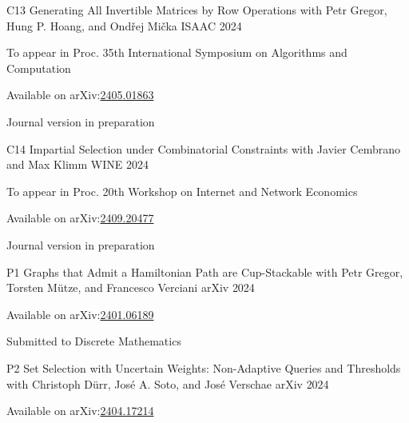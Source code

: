 \begin{cvpublication}
	{C13}
	{Generating All Invertible Matrices by Row Operations}
	{with Petr Gregor, Hung P. Hoang, and Ondřej Mička}
	{ISAAC}
	{2024}
    {
	\begin{cvitems}
	\item To appear in Proc. 35th International Symposium on Algorithms and Computation
	\item[] Available on arXiv:\href{https://arxiv.org/abs/2405.01863}{2405.01863}
	\item Journal version in preparation
	\end{cvitems}
	}
\end{cvpublication}
\begin{cvpublication}
	{C14}
	{Impartial Selection under Combinatorial Constraints}
	{with Javier Cembrano and Max Klimm}
	{WINE}
	{2024}
    {
	\begin{cvitems}
	\item To appear in Proc. 20th Workshop on Internet and Network Economics
	\item[] Available on arXiv:\href{https://arxiv.org/abs/2409.20477}{2409.20477}
	\item Journal version in preparation
	\end{cvitems}
	}
\end{cvpublication}
\begin{cvpublication}
	{P1}
	{Graphs that Admit a Hamiltonian Path are Cup-Stackable}
	{with Petr Gregor, Torsten Mütze, and Francesco Verciani}
	{arXiv}
    {2024}
	{
	\begin{cvitems}
		\item Available on arXiv:\href{https://arxiv.org/abs/2401.06189}{2401.06189}
		\item Submitted to Discrete Mathematics
	\end{cvitems}
	}
\end{cvpublication}
\begin{cvpublication}
	{P2}
	{Set Selection with Uncertain Weights: Non-Adaptive Queries and Thresholds}
	{with Christoph Dürr, José A. Soto, and José Verschae}
	{arXiv}
    {2024}
	{
	\begin{cvitems}
		\item Available on arXiv:\href{https://arxiv.org/abs/2404.17214}{2404.17214}
	\end{cvitems}
	}
\end{cvpublication}